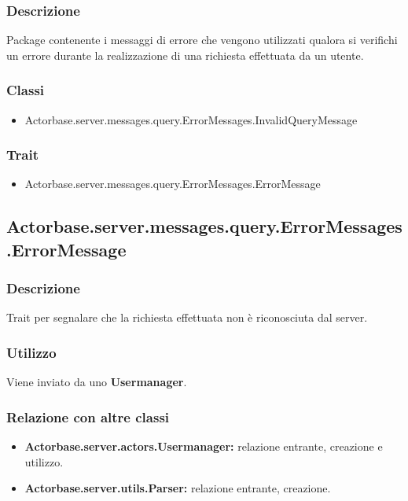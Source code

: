 \documentclass[a4paper]{article}
\begin{document}
			\subsubsection{Descrizione}
				Package contenente i messaggi di errore che vengono utilizzati qualora si verifichi un errore durante la 
				realizzazione di una richiesta effettuata da un utente.
				
			\subsubsection{Classi}
				\begin{itemize}
					\item Actorbase.server.messages.query.ErrorMessages.InvalidQueryMessage
				\end{itemize}
				
			\subsubsection{Trait}
				\begin{itemize}
					\item Actorbase.server.messages.query.ErrorMessages.ErrorMessage
				\end{itemize}
				
		\subsection{Actorbase.server.messages.query.ErrorMessages.ErrorMessage}
			\subsubsection{Descrizione}
				Trait per segnalare che la richiesta effettuata non è riconosciuta dal server.
				
			\subsubsection{Utilizzo}
				Viene inviato da uno \textbf{Usermanager}.
				
			\subsubsection{Relazione con altre classi}
				\begin{itemize}
					\item \textbf{Actorbase.server.actors.Usermanager:} relazione entrante, creazione e utilizzo.
					\item \textbf{Actorbase.server.utils.Parser:} relazione entrante, creazione.
				\end{itemize}
				
\end{document}
